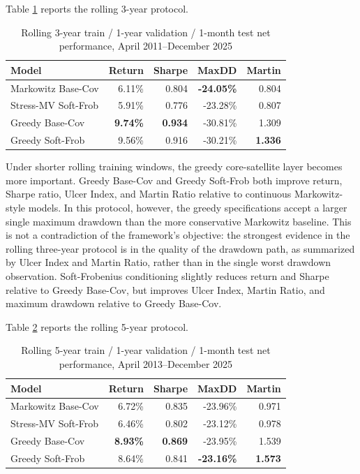 \documentclass[11pt]{article}
\begin{document}
Table \ref{tab:wf_rolling3} reports the rolling 3-year protocol.

\begin{table}[h!]
\centering
\caption{Rolling 3-year train / 1-year validation / 1-month test net performance, April 2011--December 2025}
\label{tab:wf_rolling3}
\begin{tabular}{lrrrr}
\toprule
Model & Return & Sharpe & MaxDD & Martin \\
\midrule
Markowitz Base-Cov & 6.11\% & 0.804 & \textbf{-24.05\%} & 0.804 \\
Stress-MV Soft-Frob & 5.91\% & 0.776 & -23.28\% & 0.807 \\
Greedy Base-Cov & \textbf{9.74\%} & \textbf{0.934} & -30.81\% & 1.309 \\
Greedy Soft-Frob & 9.56\% & 0.916 & -30.21\% & \textbf{1.336} \\
\bottomrule
\end{tabular}
\end{table}

Under shorter rolling training windows, the greedy core-satellite layer becomes more important. Greedy Base-Cov and Greedy Soft-Frob both improve return, Sharpe ratio, Ulcer Index, and Martin Ratio relative to continuous Markowitz-style models. In this protocol, however, the greedy specifications accept a larger single maximum drawdown than the more conservative Markowitz baseline. This is not a contradiction of the framework's objective: the strongest evidence in the rolling three-year protocol is in the quality of the drawdown path, as summarized by Ulcer Index and Martin Ratio, rather than in the single worst drawdown observation. Soft-Frobenius conditioning slightly reduces return and Sharpe relative to Greedy Base-Cov, but improves Ulcer Index, Martin Ratio, and maximum drawdown relative to Greedy Base-Cov.

Table \ref{tab:wf_rolling5} reports the rolling 5-year protocol.

\begin{table}[h!]
\centering
\caption{Rolling 5-year train / 1-year validation / 1-month test net performance, April 2013--December 2025}
\label{tab:wf_rolling5}
\begin{tabular}{lrrrr}
\toprule
Model & Return & Sharpe & MaxDD & Martin \\
\midrule
Markowitz Base-Cov & 6.72\% & 0.835 & -23.96\% & 0.971 \\
Stress-MV Soft-Frob & 6.46\% & 0.802 & -23.12\% & 0.978 \\
Greedy Base-Cov & \textbf{8.93\%} & \textbf{0.869} & -23.95\% & 1.539 \\
Greedy Soft-Frob & 8.64\% & 0.841 & \textbf{-23.16\%} & \textbf{1.573} \\
\bottomrule
\end{tabular}
\end{table}
\end{document}
